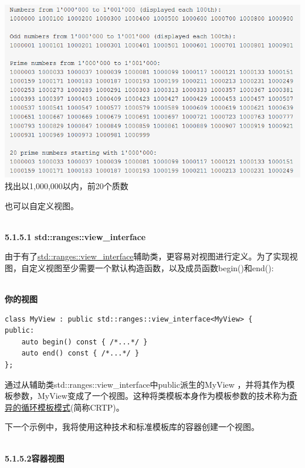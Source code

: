 \begin{center}
\includegraphics[width=1.0\textwidth]{content/3/chapter5/images/1-2.png}\\
找出以1,000,000以内，前20个质数
\end{center}


也可以自定义视图。

\hspace*{\fill} \\ %
\noindent
\textbf{5.1.5.1\hspace{0.2cm} std::ranges::view\_interface}

由于有了\href{https://en.cppreference.com/w/cpp/ranges/view_interface}{std::ranges::view\_interface}辅助类，更容易对视图进行定义。为了实现视图，自定义视图至少需要一个默认构造函数，以及成员函数begin()和end():

\hspace*{\fill} \\ %
\noindent
\textbf{你的视图}
\begin{lstlisting}[style=styleCXX]
class MyView : public std::ranges::view_interface<MyView> {
public:
	auto begin() const { /*...*/ }
	auto end() const { /*...*/ }
};
\end{lstlisting}

通过从辅助类std::ranges::view\_interface中public派生的MyView ，并将其作为模板参数，MyView变成了一个视图。这种将类模板本身作为模板参数的技术称为\href{https://www.modernescpp.com/index.php/c-is-still-lazy}{奇异的循环模板模式}(简称CRTP)。

下一个示例中，我将使用这种技术和标准模板库的容器创建一个视图。

\hspace*{\fill} \\ %
\noindent
\textbf{5.1.5.2\hspace{0.2cm}容器视图}

